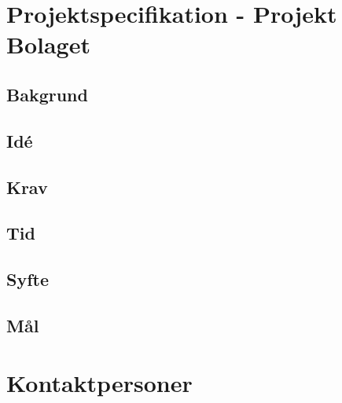 \section*{Projektspecifikation - Projekt Bolaget}
\subsection*{Bakgrund}

\subsection*{Idé}

\subsection*{Krav}

\subsection*{Tid}

\subsection*{Syfte}

\subsection*{Mål}

\newpage
\section*{Kontaktpersoner}

